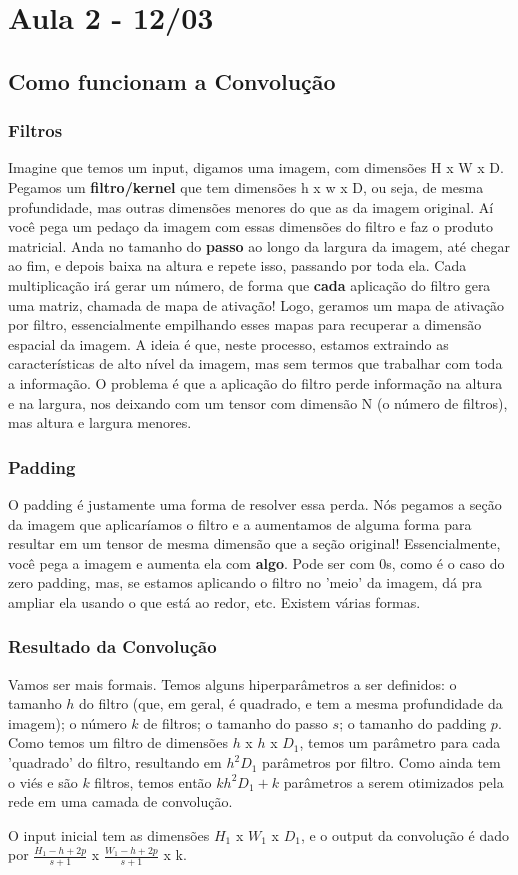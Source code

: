 \documentclass{article}
\begin{document}
\section{Aula 2 - 12/03}
\subsection{Como funcionam a Convolução}
\subsubsection{Filtros}
Imagine que temos um input, digamos uma imagem, com dimensões H x W x D. Pegamos um \textbf{filtro/kernel} que tem dimensões h x w x D, ou seja, de mesma profundidade, mas outras dimensões menores do que as da imagem original. Aí você pega um pedaço da imagem com essas dimensões do filtro e faz o produto matricial. Anda no tamanho do \textbf{passo} ao longo da largura da imagem, até chegar ao fim, e depois baixa na altura e repete isso, passando por toda ela. Cada multiplicação irá gerar um número, de forma que \textbf{cada} aplicação do filtro gera uma matriz, chamada de mapa de ativação! Logo, geramos um mapa de ativação por filtro, essencialmente empilhando esses mapas para recuperar a dimensão espacial da imagem. 
A ideia é que, neste processo, estamos extraindo as características de alto nível da imagem, mas sem termos que trabalhar com toda a informação. O problema é que a aplicação do filtro perde informação na altura e na largura, nos deixando com um tensor com dimensão N (o número de filtros), mas altura e largura menores. 
\subsubsection{Padding}
O padding é justamente uma forma de resolver essa perda. Nós pegamos a seção da imagem que aplicaríamos o filtro e a aumentamos de alguma forma para resultar em um tensor de mesma dimensão que a seção original! Essencialmente, você pega a imagem e aumenta ela com \textbf{algo}. Pode ser com 0s, como é o caso do zero padding, mas, se estamos aplicando o filtro no 'meio' da imagem, dá pra ampliar ela usando o que está ao redor, etc. Existem várias formas.
\subsubsection{Resultado da Convolução}
Vamos ser mais formais. Temos alguns hiperparâmetros a ser definidos:
o tamanho $h$ do filtro (que, em geral, é quadrado, e tem a mesma profundidade da imagem); o número $k$ de filtros; o tamanho do passo $s$; o tamanho do padding $p$. Como temos um filtro de dimensões $h$ x $h$ x $D_1$, temos um parâmetro para cada 'quadrado' do filtro, resultando em $h^2 D_1$ parâmetros por filtro. Como ainda tem o viés e são $k$ filtros, temos então $kh^2D_1 + k$ parâmetros a serem otimizados pela rede em uma camada de convolução. \par
O input inicial tem as dimensões $H_1$ x $W_1$ x $D_1$, e o output da convolução é dado por $\frac{H_1 - h + 2p}{s+1}$ x $\frac{W_1 - h + 2p}{s+1}$ x k.
\end{document}
